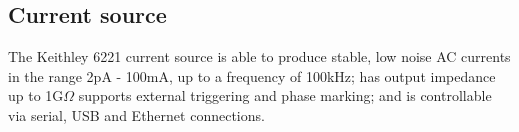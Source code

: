 \subsection{Current source}

The Keithley 6221 current source is able to produce stable, low noise AC currents in the range 2pA - 100mA, up to a frequency of 100kHz; has output impedance up to 1G\(\Omega\) supports external triggering and phase marking; and is controllable via serial, USB and Ethernet connections.